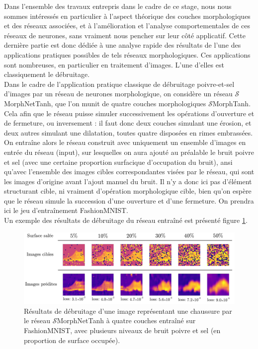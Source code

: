 Dans l'ensemble des travaux entrepris dans le cadre de ce stage, nous nous sommes intéressés en particulier à l'aspect théorique des couches morphologiques et des réseaux associées, et à l'amélioration et l'analyse comportementales de ces réseaux de neurones, sans vraiment nous pencher sur leur côté applicatif. Cette dernière partie est donc dédiée à une analyse rapide des résultats de l'une des applications pratiques possibles de tels réseaux morphologiques. Ces applications sont nombreuses, en particulier en traitement d'images. L'une d'elles est classiquement le débruitage. \\

\vspace{-1.0mm}
\noindent Dans le cadre de l'application pratique classique de débruitage poivre-et-sel d'images par un réseau de neurones morphologique, on considère un réseau $\mathcal{S}$MorphNetTanh, que l'on munit de quatre couches morphologiques $\mathcal{S}$MorphTanh. Cela afin que le réseau puisse simuler successivement les opérations d'ouverture et de fermeture, ou inversement : il faut donc deux couches simulant une érosion, et deux autres simulant une dilatation, toutes quatre disposées en rimes embrassées. On entraîne alors le réseau construit avec uniquement un ensemble d'images en entrée du réseau (input), sur lesquelles on aura ajouté au préalable le bruit poivre et sel (avec une certaine proportion surfacique d'occupation du bruit), ansi qu'avec l'ensemble des images cibles correspondantes visées par le réseau, qui sont les images d'origine avant l'ajout manuel du bruit. Il n'y a donc ici pas d'élément structurant cible, ni vraiment d'opération morphologique cible, bien qu'on espère que le réseau simule la succession d'une ouverture et d'une fermeture. On prendra ici le jeu d'entraînement FashionMNIST. \\

\vspace{-1.0mm}
\noindent Un exemple des résultats de débruitage du réseau entraîné est présenté figure \ref{fig:debruitage}.


\newpage

\begin{figure}[htp]
  \begin{center}
    \includegraphics[width=0.90\linewidth]{parts/4-analyse_des_reseaux/others/figures/shoes_data.pdf}
    \vspace{1.2mm}
    \caption{ \centering Résultats de débruitage d'une image représentant une chaussure par le réseau $\mathcal{S}$MorphNetTanh à quatre couches entraîné sur FashionMNIST, avec plusieurs niveaux de bruit poivre et sel (en proportion de surface occupée).}
    \label{fig:debruitage}
  \end{center}
\end{figure}

